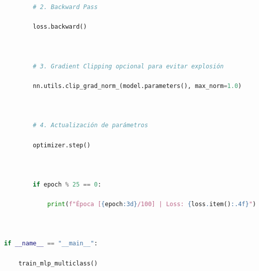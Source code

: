 \documentclass[11pt,oneside]{article}
\begin{document}
\begin{lstlisting}[language=Python]
        

        # 2. Backward Pass

        loss.backward()

        

        # 3. Gradient Clipping opcional para evitar explosión

        nn.utils.clip_grad_norm_(model.parameters(), max_norm=1.0)

        

        # 4. Actualización de parámetros

        optimizer.step()

        

        if epoch % 25 == 0:

            print(f"Época [{epoch:3d}/100] | Loss: {loss.item():.4f}")



if __name__ == "__main__":

    train_mlp_multiclass()



\end{lstlisting}
\end{document}
